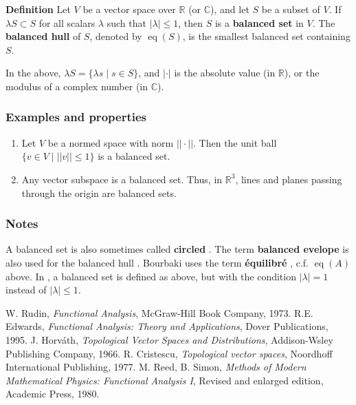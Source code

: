 \documentclass[12pt]{article}
\newcommand{\sR}[0]{\mathbb{R}}
\newcommand{\sC}[0]{\mathbb{C}}
\begin{document}

{\bf Definition} \cite{rudin_fap,edwards, horvath, cristescu} 
Let $V$ be a vector space over $\sR$ (or $\sC$),
and let $S$ be a subset of $V$. If $\lambda S\subset S$ for all scalars $\lambda$ such
that $|\lambda|\le 1$, then $S$ is a {\bf balanced set} in $V$.
The {\bf balanced hull} of $S$,
denoted by $\operatorname{eq}(S)$, is the smallest 
balanced set containing $S$. 

In the above, 
 $\lambda S = \{ \lambda s\mid s\in S\}$, 
and $|\cdot|$ is the absolute value (in $\sR$),
or the modulus of a complex number (in $\sC$).

\subsubsection{Examples and properties}
\begin{enumerate}
\item Let $V$ be a normed space with norm $||\cdot||$. Then the unit ball
$\{v\in V\mid ||v||\le 1\}$ is a balanced set.
\item Any vector subspace is a balanced set. Thus, in $\sR^3$, lines and planes passing
through the origin are balanced sets.
\end{enumerate}

\subsubsection{Notes}
A balanced set is also sometimes called {\bf circled} \cite{horvath}.
The term {\bf balanced evelope} is also used for the balanced hull \cite{edwards}.
Bourbaki uses the term {\bf \'equilibr\'e} \cite{edwards}, c.f. $\operatorname{eq}(A)$ 
above. In \cite{reed}, a balanced set is defined as above, but with the condition $|\lambda|=1$ instead of $|\lambda|\le 1$. 


 \begin{thebibliography}{9}
 W. Rudin, \emph{Functional Analysis},
McGraw-Hill Book Company, 1973.
 R.E. Edwards, \emph{Functional Analysis: Theory and Applications},
 Dover Publications, 1995.
 J. Horv\'ath, \emph{Topological Vector Spaces and Distributions},
Addison-Wsley Publishing Company, 1966.
  R. Cristescu, \emph{Topological vector spaces},
 Noordhoff International Publishing, 1977.
 M. Reed, B. Simon,
 \emph{Methods of Modern Mathematical Physics: Functional Analysis I},
 Revised and enlarged edition, Academic Press, 1980.
 
 \end{thebibliography}
\end{document}
